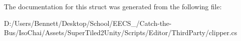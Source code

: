 The documentation for this struct was generated from the following file\+:\begin{DoxyCompactItemize}
\item 
D\+:/\+Users/\+Bennett/\+Desktop/\+School/\+E\+E\+C\+S\+\_/\+Catch-\/the-\/\+Bus/\+Iso\+Chai/\+Assets/\+Super\+Tiled2\+Unity/\+Scripts/\+Editor/\+Third\+Party/clipper.\+cs\end{DoxyCompactItemize}
